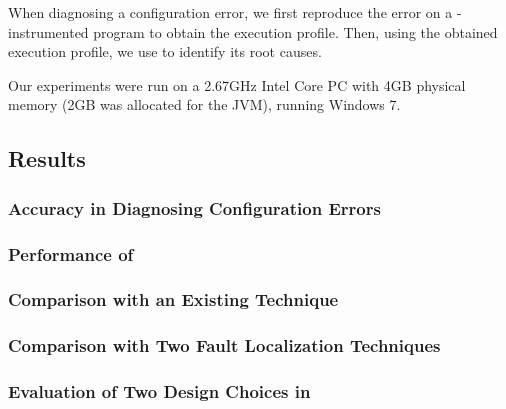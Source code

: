 When diagnosing a configuration error, we first reproduce the
error on a \ourtool-instrumented program to obtain the
execution profile. Then, using the obtained execution profile, we use \ourtool
to identify its root causes.


Our experiments were run on a
2.67GHz Intel Core PC with 4GB physical memory (2GB was allocated
for the JVM), running Windows 7.


\subsection{Results}
\label{sec:results}


\subsubsection{Accuracy in Diagnosing Configuration Errors}
\label{sec:accuracy}


\subsubsection{Performance of \ourtool}
\label{sec:performance}


\subsubsection{Comparison with an Existing Technique}
\label{sec:confanalyzer}



\subsubsection{Comparison with Two Fault Localization Techniques}
\label{sec:comparison}




\subsubsection{Evaluation of Two Design Choices in \ourtool}
\label{sec:choices}



